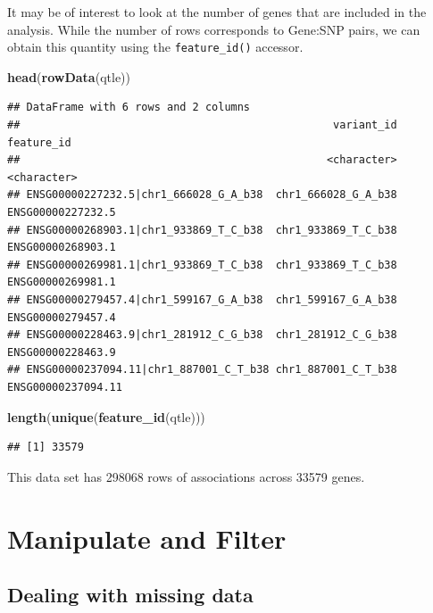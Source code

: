 \documentclass[
]{article}
\newenvironment{Shaded}{\begin{snugshade}}{\end{snugshade}}
\newcommand{\FunctionTok}[1]{\textcolor[rgb]{0.13,0.29,0.53}{\textbf{#1}}}
\newcommand{\NormalTok}[1]{#1}
\begin{document}
\normalsize

It may be of interest to look at the number of genes that are included
in the analysis. While the number of rows corresponds to Gene:SNP pairs,
we can obtain this quantity using the \texttt{feature\_id()} accessor.

\footnotesize

\begin{Shaded}
\begin{Highlighting}[]
\FunctionTok{head}\NormalTok{(}\FunctionTok{rowData}\NormalTok{(qtle))}
\end{Highlighting}
\end{Shaded}

\begin{verbatim}
## DataFrame with 6 rows and 2 columns
##                                                 variant_id         feature_id
##                                                <character>        <character>
## ENSG00000227232.5|chr1_666028_G_A_b38  chr1_666028_G_A_b38  ENSG00000227232.5
## ENSG00000268903.1|chr1_933869_T_C_b38  chr1_933869_T_C_b38  ENSG00000268903.1
## ENSG00000269981.1|chr1_933869_T_C_b38  chr1_933869_T_C_b38  ENSG00000269981.1
## ENSG00000279457.4|chr1_599167_G_A_b38  chr1_599167_G_A_b38  ENSG00000279457.4
## ENSG00000228463.9|chr1_281912_C_G_b38  chr1_281912_C_G_b38  ENSG00000228463.9
## ENSG00000237094.11|chr1_887001_C_T_b38 chr1_887001_C_T_b38 ENSG00000237094.11
\end{verbatim}

\begin{Shaded}
\begin{Highlighting}[]
\FunctionTok{length}\NormalTok{(}\FunctionTok{unique}\NormalTok{(}\FunctionTok{feature\_id}\NormalTok{(qtle)))}
\end{Highlighting}
\end{Shaded}

\begin{verbatim}
## [1] 33579
\end{verbatim}

\normalsize

This data set has 298068 rows of associations across 33579 genes.
\footnotesize

\normalsize

\section{Manipulate and Filter}\label{manipulate-and-filter}

\subsection{Dealing with missing data}\label{dealing-with-missing-data}
\end{document}
